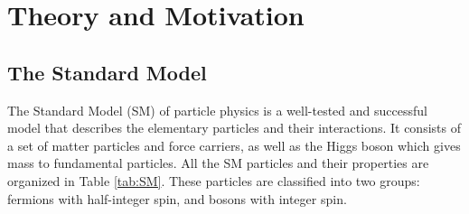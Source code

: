 \documentclass[thesis.tex]{subfiles}
\begin{document}
\chapter{Theory and Motivation}
\label{ch1}

\section{The Standard Model}
The Standard Model (SM) of particle physics is a well-tested and successful model that describes the elementary particles and their interactions. 
It consists of a set of matter particles and force carriers, as well as the Higgs boson which gives mass to fundamental particles. 
All the SM particles and their properties are organized in Table \ref{tab:SM}. 
These particles are classified into two groups: fermions with half-integer spin, and bosons with integer spin.
\end{document}

